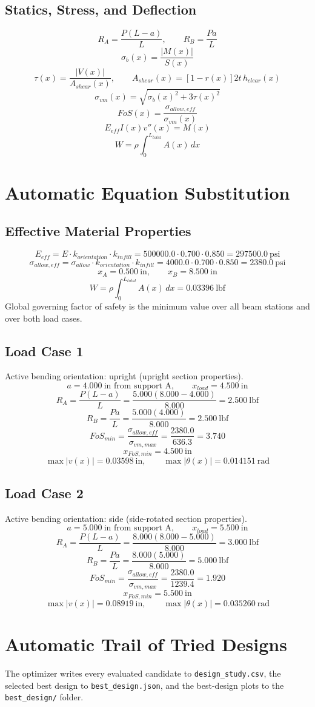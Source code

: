 \documentclass[11pt]{article}
\begin{document}
\subsection*{Statics, Stress, and Deflection}
\[
R_A=\frac{P(L-a)}{L}, \qquad R_B=\frac{Pa}{L}
\]
\[
\sigma_b(x)=\frac{|M(x)|}{S(x)}
\]
\[
\tau(x)=\frac{|V(x)|}{A_{shear}(x)}, \qquad A_{shear}(x)=[1-r(x)]2t\,h_{clear}(x)
\]
\[
\sigma_{vm}(x)=\sqrt{\sigma_b(x)^2+3\tau(x)^2}
\]
\[
FoS(x)=\frac{\sigma_{allow,eff}}{\sigma_{vm}(x)}
\]
\[
E_{eff}I(x)v''(x)=M(x)
\]
\[
W=\rho\int_0^{L_{total}} A(x)\,dx
\]

\section*{Automatic Equation Substitution}
\subsection*{Effective Material Properties}
\[E_{eff} = E \cdot k_{orientation} \cdot k_{infill} = 500000.0 \cdot 0.700 \cdot 0.850 = 297500.0\ \mathrm{psi}\]
\[\sigma_{allow,eff} = \sigma_{allow} \cdot k_{orientation} \cdot k_{infill} = 4000.0 \cdot 0.700 \cdot 0.850 = 2380.0\ \mathrm{psi}\]
\[x_A = 0.500\ \mathrm{in}, \qquad x_B = 8.500\ \mathrm{in}\]
\[W = \rho \int_0^{L_{total}} A(x)\,dx = 0.03396\ \mathrm{lbf}\]
Global governing factor of safety is the minimum value over all beam stations and over both load cases.
\subsection*{Load Case 1}
Active bending orientation: upright (upright section properties).
\[a = 4.000\ \mathrm{in} \text{ from support A}, \qquad x_{load} = 4.500\ \mathrm{in}\]
\[R_A = \frac{P(L-a)}{L} = \frac{5.000(8.000-4.000)}{8.000} = 2.500\ \mathrm{lbf}\]
\[R_B = \frac{Pa}{L} = \frac{5.000(4.000)}{8.000} = 2.500\ \mathrm{lbf}\]
\[FoS_{min} = \frac{\sigma_{allow,eff}}{\sigma_{vm,max}} = \frac{2380.0}{636.3} = 3.740\]
\[x_{FoS,min} = 4.500\ \mathrm{in}\]
\[\max |v(x)| = 0.03598\ \mathrm{in}, \qquad \max |\theta(x)| = 0.014151\ \mathrm{rad}\]
\subsection*{Load Case 2}
Active bending orientation: side (side-rotated section properties).
\[a = 5.000\ \mathrm{in} \text{ from support A}, \qquad x_{load} = 5.500\ \mathrm{in}\]
\[R_A = \frac{P(L-a)}{L} = \frac{8.000(8.000-5.000)}{8.000} = 3.000\ \mathrm{lbf}\]
\[R_B = \frac{Pa}{L} = \frac{8.000(5.000)}{8.000} = 5.000\ \mathrm{lbf}\]
\[FoS_{min} = \frac{\sigma_{allow,eff}}{\sigma_{vm,max}} = \frac{2380.0}{1239.4} = 1.920\]
\[x_{FoS,min} = 5.500\ \mathrm{in}\]
\[\max |v(x)| = 0.08919\ \mathrm{in}, \qquad \max |\theta(x)| = 0.035260\ \mathrm{rad}\]

\section*{Automatic Trail of Tried Designs}
The optimizer writes every evaluated candidate to \texttt{design\_study.csv}, the selected best design to \texttt{best\_design.json}, and the best-design plots to the \texttt{best\_design/} folder.
\end{document}

